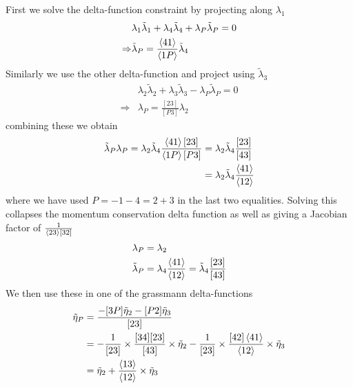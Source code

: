 \documentclass[letter,11pt]{article}
\begin{document}
First we solve the delta-function constraint by projecting along $\lambda_1$
\begin{equation}
	\begin{aligned}
		&\lambda_{1}\tilde\lambda_{1}+\lambda_{4}\tilde\lambda_{4}+\lambda_{P}\tilde\lambda_{P}=0\\
		\Rightarrow& \tilde\lambda_{P}=\frac{\expval{41}}{\expval{1P}}\tilde\lambda_4
	\end{aligned}
\end{equation}
Similarly we use the other delta-function and project using $\tilde \lambda_3$
\begin{equation}
	\begin{aligned}
		&\lambda_{2}\tilde\lambda_{2}+\lambda_{3}\tilde\lambda_{3}-\lambda_{P}\tilde\lambda_{P}=0\\
		\Rightarrow& 
		\lambda_{P}=\frac{[23]}{[P3]}\lambda_2
	\end{aligned}
\end{equation}
combining these we obtain
\begin{equation}
	\begin{aligned}
		\tilde\lambda_P \lambda_P=\lambda_2 \tilde\lambda_4 \frac{\expval{41}[23]}{\expval{1P}[P3]}&=\lambda_2 \tilde\lambda_4 \frac{[23]}{[43]}\\
		&=\lambda_2 \tilde\lambda_4 \frac{\expval{41}}{\expval{12}}
 	\end{aligned}
\end{equation}
where we have used $P=-1-4=2+3$ in the last two equalities. Solving this collapses the momentum conservation delta function as well as giving a Jacobian factor of $\frac{1}{\expval{23}[32]}$
\begin{equation} \label{eq:sol3}
	\begin{aligned}
		\lambda_P&=\lambda_2\\
		\tilde \lambda_P&=\lambda_4 \frac{\expval{41}}{\expval{12}}=\tilde\lambda_4 \frac{[23]}{[43]}
	\end{aligned}
\end{equation}
We then use these in one of the grassmann delta-functions
\begin{equation}
	\begin{aligned}
		\tilde\eta_{P}&=\frac{-[3P]\tilde\eta_{2}-[P 2]\tilde\eta_{3}}{[23]}\\
		&=-\frac{1}{[23]}\times \frac{[34][23]}{[43]} \times\tilde \eta_2-\frac{1}{[23]}\times \frac{[42]\expval{41}}{\expval{12}} \times\tilde \eta_3\\
		&=\tilde \eta_2+ \frac{\expval{13}}{\expval{12}} \times\tilde \eta_3\\
	\end{aligned}
\end{equation}
\end{document}

